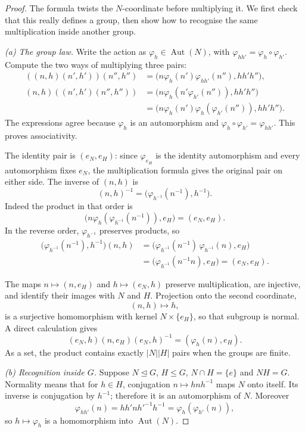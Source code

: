 \begin{proof}
The formula twists the $N$-coordinate before multiplying it. We first
check that this really defines a group, then show how to recognise
the same multiplication inside another group.

\emph{(a) The group law.}
Write the action as $\varphi_h\in\operatorname{Aut}(N)$, with
$\varphi_{hh'}=\varphi_h\circ\varphi_{h'}$.
Compute the two ways of multiplying three pairs:
\[
\begin{aligned}
((n,h)(n',h'))(n'',h'')
 &=\bigl(n\varphi_h(n')\varphi_{hh'}(n''),hh'h''\bigr),\\
(n,h)((n',h')(n'',h''))
 &=\bigl(n\varphi_h(n'\varphi_{h'}(n'')),hh'h''\bigr)\\
 &=\bigl(n\varphi_h(n')\varphi_h(\varphi_{h'}(n'')),
          hh'h''\bigr).
\end{aligned}
\]
The expressions agree because $\varphi_h$ is an automorphism and
$\varphi_h\circ\varphi_{h'}=\varphi_{hh'}$. This proves associativity.

The identity pair is $(e_N,e_H)$: since $\varphi_{e_H}$ is the
identity automorphism and every automorphism fixes $e_N$, the
multiplication formula gives the original pair on either side.
The inverse of $(n,h)$ is
\[
(n,h)^{-1}
 =\bigl(\varphi_{h^{-1}}(n^{-1}),h^{-1}\bigr).
\]
Indeed the product in that order is
\[
\bigl(n\varphi_h(\varphi_{h^{-1}}(n^{-1})),e_H\bigr)
 =(e_N,e_H).
\]
In the reverse order, $\varphi_{h^{-1}}$ preserves products, so
\[
\begin{aligned}
\bigl(\varphi_{h^{-1}}(n^{-1}),h^{-1}\bigr)(n,h)
&=\bigl(\varphi_{h^{-1}}(n^{-1})\,\varphi_{h^{-1}}(n),e_H\bigr)\\
&=\bigl(\varphi_{h^{-1}}(n^{-1}n),e_H\bigr)
=(e_N,e_H).
\end{aligned}
\]

The maps $n\mapsto(n,e_H)$ and $h\mapsto(e_N,h)$ preserve
multiplication, are injective, and identify their images with
$N$ and $H$. Projection onto the second coordinate,
\[
(n,h)\longmapsto h,
\]
is a surjective homomorphism with kernel $N\times\{e_H\}$,
so that subgroup is normal. A direct calculation gives
\[
(e_N,h)(n,e_H)(e_N,h)^{-1}
 =(\varphi_h(n),e_H).
\]
As a set, the product contains exactly $|N||H|$ pairs
when the groups are finite.

\emph{(b) Recognition inside $G$.}
Suppose $N\trianglelefteq G$, $H\le G$,
$N\cap H=\{e\}$ and $NH=G$.
Normality means that for $h\in H$, conjugation $n\mapsto hnh^{-1}$
maps $N$ onto itself. Its inverse is conjugation by $h^{-1}$;
therefore it is an automorphism of $N$. Moreover
\[
\varphi_{hh'}(n)
 =hh'nh'^{-1}h^{-1}
 =\varphi_h(\varphi_{h'}(n)),
\]
so $h\mapsto\varphi_h$ is a homomorphism into
$\operatorname{Aut}(N)$.


\end{proof}
